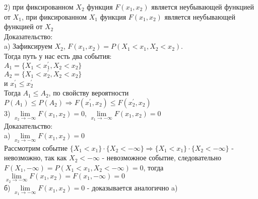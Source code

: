 2) при фиксированном $X_{2}$ функция $F(x_{1}, x_{2})$ является неубывающей функцией от $X_{1}$, при фиксированном $X_{1}$ функция $F(x_{1}, x_{2})$ является неубывающей функцией от $X_{2}$\\
Доказательство:\\
a) Зафиксируем $X_{2}$, $F(x_{1}, x_{2}) = P(X_{1} < x_{1}, X_{2} < x_{2})$.\\
Тогда путь у нас есть два события:\\
$A_{1} = \{X_{1} < x_{1}^{'}, X_{2} < x_{2}\}$\\
$A_{2} = \{X_{1} < x_{2}^{'}, X_{2} < x_{2}\}$\\
и $x_{1}^{'} \leqslant x_{2}^{'}$\\
Тогда $A_{1} \leqslant A_{2}$, по свойству вероятности $P(A_{1}) \leqslant P(A_{2}) \Rightarrow F(x_{1}^{'}, x_{2}) \leqslant F(x_{2}^{'}, x_{2})$\\

3) $\lim\limits_{x_{2} \rightarrow -\infty} F(x_{1}, x_{2}) = 0$, $\lim\limits_{x_{1} \rightarrow -\infty} F(x_{1}, x_{2}) = 0$\\
Доказательство:\\
a) $\lim\limits_{x_{2} \rightarrow -\infty} F(x_{1}, x_{2}) = 0$\\
Рассмотрим событие $\{X_{1} < x_{1}\} \cdot \{X_{2} < -\infty\} \Rightarrow \{X_{1} < x_{1}\} \cdot \{X_{2} < -\infty\}$ - невозможно, так как $X_{2} < -\infty$ - невозможное событие, следовательно $F(X_{1}, -\infty) = P(X_{1} < x_{1}, X_{2} < -\infty) = 0$, тогда $\lim\limits_{x_{2} \rightarrow -\infty} F(x_{1}, x_{2}) = F(x_{1}, -\infty) = 0$\\
б) $\lim\limits_{x_{1} \rightarrow -\infty} F(x_{1}, x_{2}) = 0$ - доказывается аналогично a)\\

